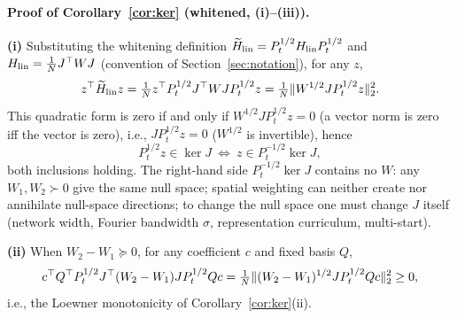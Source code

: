 \documentclass[11pt]{article}
\DeclarePairedDelimiter{\norm}{\lVert}{\rVert}
\newcommand{\W}{W}
\newcommand{\wt}[1]{\widetilde{#1}}
\numberwithin{equation}{section}
\begin{document}
\paragraph{Proof of Corollary~\ref{cor:ker} (whitened, (i)--(iii)).}
\textbf{(i)} Substituting the whitening definition $\wt H_{\rm lin}=P_t^{1/2}H_{\rm lin}P_t^{1/2}$ and $H_{\rm lin}=\tfrac1N J^\top\W J$ (convention of Section~\ref{sec:notation}), for any $z$,
\begin{equation}
z^\top\wt H_{\rm lin}z
=\tfrac1N z^\top P_t^{1/2}J^\top\W JP_t^{1/2}z
=\tfrac1N\norm{\W^{1/2}JP_t^{1/2}z}_2^2 .
\end{equation}
This quadratic form is zero if and only if $\W^{1/2}JP_t^{1/2}z=0$ (a vector norm is zero iff the vector is zero), i.e., $JP_t^{1/2}z=0$ ($\W^{1/2}$ is invertible), hence
\begin{equation}
P_t^{1/2}z\in\ker J\ \Longleftrightarrow\ z\in P_t^{-1/2}\ker J,
\end{equation}
both inclusions holding. The right-hand side $P_t^{-1/2}\ker J$ contains no $\W$: any $\W_1,\W_2\succ0$ give the same null space; spatial weighting can neither create nor annihilate null-space directions; to change the null space one must change $J$ itself (network width, Fourier bandwidth $\sigma$, representation curriculum, multi-start).

\noindent\textbf{(ii)} When $\W_2-\W_1\succeq0$, for any coefficient $c$ and fixed basis $Q$,
\begin{equation}
c^\top Q^\top P_t^{1/2}J^\top(\W_2-\W_1)JP_t^{1/2}Qc
=\tfrac1N\norm{(\W_2-\W_1)^{1/2}JP_t^{1/2}Qc}_2^2\ge0,
\end{equation}
i.e., the Loewner monotonicity of Corollary~\ref{cor:ker}(ii).
\end{document}
